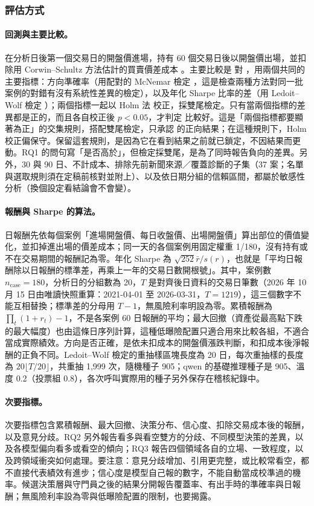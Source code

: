 \subsubsection{評估方式}

\paragraph{回測與主要比較。} 在分析日後第一個交易日的開盤價進場，持有 60 個交易日後以開盤價出場，並扣除用 Corwin--Schultz 方法估計的買賣價差成本 \citep{corwin2012spread}。主要比較是  對 ，用兩個共同的主要指標：方向準確率（用配對的 McNemar 檢定 \citep{mcnemar1947}，這是檢查兩種方法對同一批案例的對錯有沒有系統性差異的檢定），以及年化 Sharpe 比率的差（用 Ledoit--Wolf 檢定 \citep{ledoit2008sharpe}）；兩個指標一起以 Holm 法 \citep{holm1979} 校正，採雙尾檢定。只有當兩個指標的差異都是正的，而且各自校正後 $p<0.05$，才判定  比較好。這是「兩個指標都要顯著為正」的交集規則，搭配雙尾檢定，只承認  的正向結果；在這種規則下，Holm 校正偏保守。保留這套規則，是因為它在看到結果之前就已鎖定，不因結果而更動。RQ1 的問句寫「是否高於」，但檢定採雙尾，是為了同時報告負向的差異。另外，30 與 90 日、不計成本、排除先前新聞來源／覆蓋診斷的子集（37 案；名單與選取規則須在定稿前核對並附上）、以及依日期分組的信賴區間，都屬於敏感性分析（換個設定看結論會不會變）。

\paragraph{報酬與 Sharpe 的算法。} 日報酬先依每個案例「進場開盤價、每日收盤價、出場開盤價」算出部位的價值變化，並扣掉進出場的價差成本；同一天的各個案例用固定權重 1/180，沒有持有或不在交易期間的報酬記為零。年化 Sharpe 為 $\sqrt{252}\bar r/s(r)$，也就是「平均日報酬除以日報酬的標準差，再乘上一年的交易日數開根號」。其中，案例數 $n_{\mathrm{case}}=180$，分析日的分組數為 20，$T$ 是對齊後日資料的交易日筆數（2026 年 10 月 15 日由唯讀快照重算：2021-04-01 至 2026-03-31，$T=1219$），這三個數字不能互相替換；標準差的分母用 $T-1$，無風險利率明設為零。累積報酬為 $\prod_t(1+r_t)-1$，不是各案例 60 日報酬的平均；最大回撤（資產從最高點下跌的最大幅度）也由這條日序列計算，這種低曝險配置只適合用來比較各組，不適合當成實際績效。方向是否正確，是依未扣成本的開盤價漲跌判斷，和扣成本後淨報酬的正負不同。Ledoit--Wolf 檢定的重抽樣區塊長度為 20 日，每次重抽樣的長度為 $20\lfloor T/20\rfloor$，共重抽 1,999 次，隨機種子 905；qwen 的基礎推理種子是 905、溫度 0.2（投票組 0.8），各次呼叫實際用的種子另外保存在稽核紀錄中。

\paragraph{次要指標。} 次要指標包含累積報酬、最大回撤、決策分布、信心度、扣除交易成本後的報酬，以及意見分歧。RQ2 另外報告看多與看空雙方的分歧、不同模型決策的差異，以及各模型偏向看多或看空的傾向；RQ3 報告四個領域各自的立場、一致程度，以及跨領域衝突如何處理。要注意：意見分歧增加、引用更完整，或比較常看空，都不直接代表績效有進步；信心度是模型自己報的數字，不能自動當成校準過的機率。候選決策層與守門員之後的結果分開報告覆蓋率、有出手時的準確率與日報酬；無風險利率設為零與低曝險配置的限制，也要揭露。

